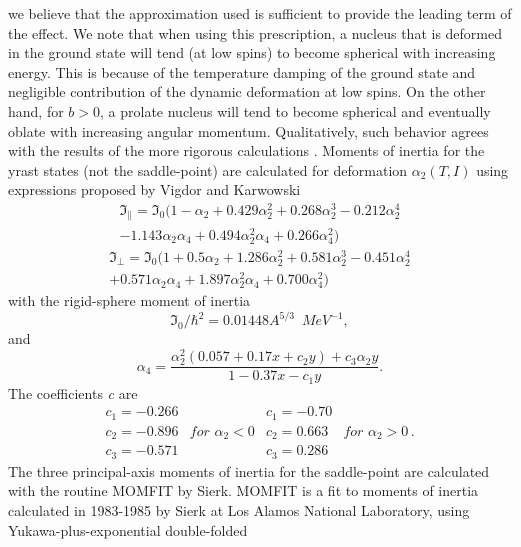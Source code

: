 \documentclass[twocolumn,amsmath,amssymb,10pt,groupedaddress,letter]{revtex4}
\begin{document}
we believe that the approximation used is sufficient to provide the
leading term of the effect. We note that when using this prescription,
a nucleus that is deformed in the ground state will tend (at low spins)
to become spherical with increasing energy. This is because of the
temperature damping of the ground state and negligible contribution
of the dynamic deformation at low spins. On the other hand, for $b>0$,
a prolate nucleus will tend to become spherical and eventually oblate
with increasing angular momentum. Qualitatively, such behavior agrees
with the results of the more rigorous calculations \cite{and76}.
Moments of inertia for the yrast states (not the saddle-point) are
calculated for deformation $\alpha_{2}(T,I)$ using expressions proposed
by Vigdor and Karwowski \cite{VK}
\begin{eqnarray}
\Im_{\parallel}=\Im_{0}(1-\alpha_{2}+0.429\alpha_{2}^{2}+0.268\alpha_{2}^{3}-0.212\alpha_{2}^{4}\nonumber \\
-1.143\alpha_{2}\alpha_{4}+0.494\alpha_{2}^{2}\alpha_{4}+0.266\alpha_{4}^{2})\label{MOMpar}\end{eqnarray}
\begin{eqnarray}
\Im_{\perp}=\Im_{0}(1+0.5\alpha_{2}+1.286\alpha_{2}^{2}+0.581\alpha_{2}^{3}-0.451\alpha_{2}^{4}\nonumber \\
+0.571\alpha_{2}\alpha_{4}+1.897\alpha_{2}^{2}\alpha_{4}+0.700\alpha_{4}^{2})\label{MOMort}\end{eqnarray}
with the rigid-sphere moment of inertia \begin{equation}
\Im_{0}/\hbar^{2}=0.01448A^{5/3}\,\,\, MeV^{-1},\end{equation}
and \begin{equation}
\alpha_{4}=\frac{\alpha_{2}^{2}(0.057+0.17x+c_{2}y)+c_{3}\alpha_{2}y}{1-0.37x-c_{1}y}.\end{equation}
The coefficients \emph{c} are \begin{equation}
\begin{array}{llll}
c_{1}=-0.266 &  & c_{1}=-0.70\\
c_{2}=-0.896 & for\,\,\alpha_{2}<0 & c_{2}=0.663 & for\,\,\alpha_{2}>0\,.\\
c_{3}=-0.571 &  & c_{3}=0.286\end{array}\end{equation}
The three principal-axis moments of inertia for the saddle-point are
calculated with the routine MOMFIT \cite{sierk} by Sierk. MOMFIT
is a fit to moments of inertia calculated in 1983-1985 by Sierk at
Los Alamos National Laboratory, using Yukawa-plus-exponential double-folded
\end{document}
